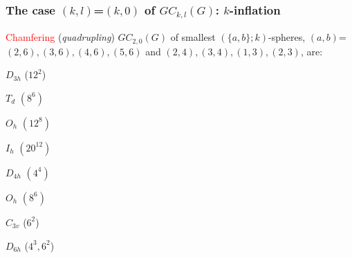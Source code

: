 \documentclass{beamer}
\begin{document}
\begin{frame}\frametitle{The case $(k,l)$=$(k,0)$ of $GC_{k,l}(G)$: $k$-inflation}
\vspace{-2.5mm}

 \textcolor{red}{Chamfering} ({\em quadrupling}) $GC_{2,0}(G)$  of smallest
  $(\{a,b\};k)$-spheres,  
 $(a,b)$=$(2,6),(3,6),(4,6),(5,6)$ and $(2,4),(3,4),(1,3),(2,3)$,  are: 
\begin{center}
\begin{minipage}[b]{18mm}
\centering
{}\par
$D_{3h}$  ($12^2$)
\end{minipage}
\begin{minipage}[b]{26mm}
\centering
{}\par
 $T_d$ $(8^6)$
\end{minipage}
\begin{minipage}[b]{23mm}
\centering
{}\par
 $O_h$ $(12^8)$
\end{minipage}
\begin{minipage}[b]{25mm}
\centering
{}\par
 $I_h$ $(20^{12})$
\end{minipage}
\begin{minipage}[b]{26mm}
\centering
{}\par
 $D_{4h}$ $(4^{4})$
\end{minipage}
\begin{minipage}[b]{20mm}
\centering
{}\par
 $O_h$ $(8^6)$
\end{minipage}
\begin{minipage}[b]{23mm}
\centering
{}\par
$C_{3v}$  ($6^2$)
\end{minipage}
\begin{minipage}[b]{20mm}
\centering
{}\par
$D_{6h}$  ($4^3,6^2$)
\end{minipage}


\end{center}  
\end{frame}
\end{document}
